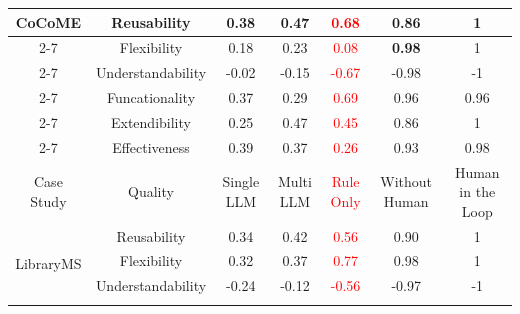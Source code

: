 \documentclass[pdflatex,sn-mathphys-num]{sn-jnl}%
\theoremstyle{thmstyleone}%
\theoremstyle{thmstyletwo}%
\theoremstyle{thmstylethree}%
\begin{document}
\begin{table}[!htb]
{\begin{threeparttable}
\begin{tabular}{|c|c|cc|c|cc|}
\multirow{6}{*}{CoCoME}     & Reusability              & \multicolumn{1}{c|}{0.38}           & 0.47           & \multicolumn{1}{c|}{\textcolor{red}{0.68}}          & \multicolumn{1}{c|}{0.86}          & 1                 \\ \cline{2-7} 
                            & Flexibility              & \multicolumn{1}{c|}{0.18}           & 0.23           & \multicolumn{1}{c|}{\textcolor{red}{0.08}}          & \multicolumn{1}{c|}{\textbf{0.98}}          & 1                 \\ \cline{2-7} 
                            & Understandability        & \multicolumn{1}{c|}{-0.02} & -0.15          & \multicolumn{1}{c|}{\textcolor{red}{-0.67}}          & \multicolumn{1}{c|}{-0.98}         & -1                \\ \cline{2-7} 
                            & Funcationality           & \multicolumn{1}{c|}{0.37}           & 0.29           & \multicolumn{1}{c|}{\textcolor{red}{0.69}}          & \multicolumn{1}{c|}{0.96}          & 0.96              \\ \cline{2-7} 
                            & Extendibility            & \multicolumn{1}{c|}{0.25}           & 0.47           & \multicolumn{1}{c|}{\textcolor{red}{0.45}}          & \multicolumn{1}{c|}{0.86}          & 1                 \\ \cline{2-7} 
                            & Effectiveness            & \multicolumn{1}{c|}{0.39}           & 0.37           & \multicolumn{1}{c|}{\textcolor{red}{0.26}}          & \multicolumn{1}{c|}{0.93}          & 0.98              \\ \hline
Case Study                  & Quality                  & \multicolumn{1}{c|}{Single LLM}     & Multi LLM      & \multicolumn{1}{c|}{\textcolor{red}{Rule Only}} & \multicolumn{1}{c|}{Without Human} & Human in the Loop \\ \hline
\multirow{6}{*}{LibraryMS}  & Reusability              & \multicolumn{1}{c|}{0.34}           & 0.42           & \multicolumn{1}{c|}{\textcolor{red}{0.56}}          & \multicolumn{1}{c|}{0.90}           & 1                 \\ \cline{2-7} 
                            & Flexibility              & \multicolumn{1}{c|}{0.32}           & 0.37           & \multicolumn{1}{c|}{\textcolor{red}{0.77}}          & \multicolumn{1}{c|}{0.98}          & 1                 \\ \cline{2-7} 
                            & Understandability        & \multicolumn{1}{c|}{-0.24}          & -0.12 & \multicolumn{1}{c|}{\textcolor{red}{-0.56}}          & \multicolumn{1}{c|}{-0.97}         & -1                \\ \cline{2-7} 

\end{tabular}
\end{threeparttable}}
\end{table}
\end{document}
